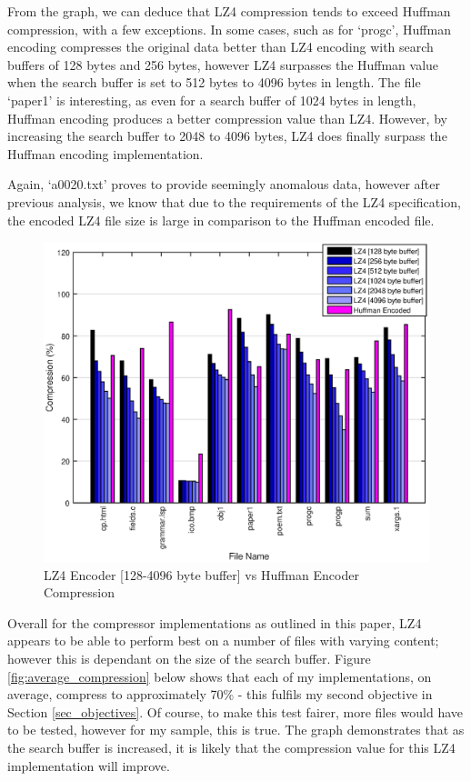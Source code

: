 \documentclass[12pt]{article}
\begin{document}
From the graph, we can deduce that LZ4 compression tends to exceed Huffman compression, with a few exceptions. In some cases, such as for `progc', Huffman encoding compresses the original data better than LZ4 encoding with search buffers of 128 bytes and 256 bytes, however LZ4 surpasses the Huffman value when the search buffer is set to 512 bytes to 4096 bytes in length. The file `paper1' is interesting, as even for a search buffer of 1024 bytes in length, Huffman encoding produces a better compression value than LZ4. However, by increasing the search buffer to 2048 to 4096 bytes, LZ4 does finally surpass the Huffman encoding implementation.

Again, `a0020.txt' proves to provide seemingly anomalous data, however after previous analysis, we know that due to the requirements of the LZ4 specification, the encoded LZ4 file size is large in comparison to the Huffman encoded file.

\begin{figure}[H]
	\centering
	\includegraphics[width=\textwidth]{lz4_compression}
	\caption{LZ4 Encoder [128-4096 byte buffer] vs Huffman Encoder Compression}
	\label{fig:lz4_compression}
\end{figure}

\clearpage
Overall for the compressor implementations as outlined in this paper, LZ4 appears to be able to perform best on a number of files with varying content; however this is dependant on the size of the search buffer. Figure \ref{fig:average_compression} below shows that each of my implementations, on average, compress to approximately 70\% - this fulfils my second objective in Section \ref{sec_objectives}. Of course, to make this test fairer, more files would have to be tested, however for my sample, this is true. The graph demonstrates that as the search buffer is increased, it is likely that the compression value for this LZ4 implementation will improve. 
\end{document}

